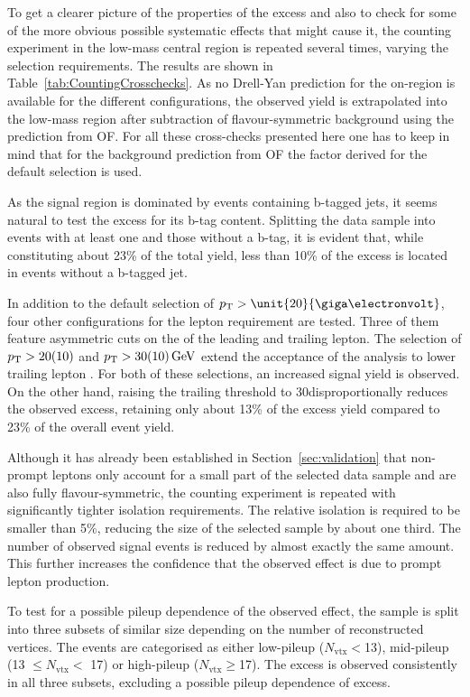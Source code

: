 To get a clearer picture of the properties of the excess and also to check for some of the more obvious possible systematic effects that might cause it, the counting experiment in the low-mass central region is repeated several times, varying the selection requirements. The results are shown in Table~\ref{tab:CountingCrosschecks}. As no Drell-Yan prediction for the on-\Z region is available for the different configurations, the observed yield is extrapolated into the low-mass region after subtraction of flavour-symmetric background using the prediction from OF. For all these cross-checks presented here one has to keep in mind that for the background prediction from OF the \Rsfof factor derived for the default selection is used.

As the signal region is dominated by events containing b-tagged jets, it seems natural to test the excess for its b-tag content. Splitting the data sample into events with at least one and those without a b-tag, it is evident that, while constituting about 23\% of the total yield, less than 10\% of the excess is located in events without a b-tagged jet. 

In addition to the default selection of $\pt > \unit{20}{\giga\electronvolt}$, four other configurations for the lepton \pt requirement are tested. Three of them feature asymmetric cuts on the \pt of the leading and trailing lepton. The selection of $p_{\mathrm{T}} > 20(10)$ and $ p_{\mathrm{T}} > 30(10)\,\mathrm{Ge\hspace{-.08em}V}$ extend the acceptance of the analysis to lower trailing lepton \pt. For both of these selections, an increased signal yield is observed. On the other hand, raising the trailing \pt threshold to 30\GeV disproportionally reduces the observed excess, retaining only about 13\% of the excess yield compared to 23\% of the overall event yield. 

Although it has already been established in Section~\ref{sec:validation} that non-prompt leptons only account for a small part of the selected data sample and are also fully flavour-symmetric, the counting experiment is repeated with significantly tighter isolation requirements. The relative isolation is required to be smaller than 5\%, reducing the size of the selected sample by about one third. The number of observed signal events is reduced by almost exactly the same amount. This further increases the confidence that the observed effect is due to prompt lepton production.

To test for a possible pileup dependence of the observed effect, the sample is split into three subsets of similar size depending on the number of reconstructed vertices. The events are categorised as either low-pileup ($N_{\mathrm{vtx}} < $13), mid-pileup (13 $\leq N_{\mathrm{vtx}} <$ 17) or high-pileup ($N_{\mathrm{vtx}} \geq $17). The excess is observed consistently in all three subsets, excluding a possible pileup dependence of excess. 

